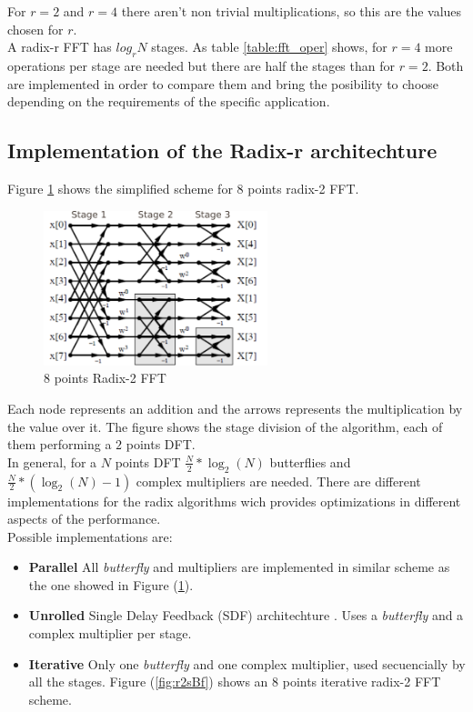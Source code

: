 \documentclass[conference]{IEEEtran}
\begin{document}
For $r=2$ and $r=4$ there aren't non trivial multiplications, so this are the values chosen for $r$.\\
A radix-r FFT has $log_rN$ stages. As table \ref{table:fft_oper} shows, for $r=4$ more operations per stage are needed but there are
half the stages than for $r=2$. Both are implemented in order to compare them and bring the posibility to choose
depending on the requirements of the specific application.

\subsection{Implementation of the Radix-r architechture}

Figure \ref{fig:r2_8} shows the simplified scheme for $8$ points radix-2 FFT.

\begin{figure}[htb!]
        \centering
        \includegraphics[width=6.5cm]{./figures/r2_8.png}
        \caption{8 points Radix-2 FFT}
        \label{fig:r2_8}
\end{figure}

Each node represents an addition and the arrows represents the multiplication by the value over it. 
The figure shows the stage division of the algorithm, each of them performing a $2$ points DFT.\\
In general, for a $N$ points DFT $\frac{N}{2}*\log_2(N)$ butterflies and $\frac{N}{2}*(\log_2(N)-1)$ complex multipliers
are needed. There are different implementations for the radix algorithms wich provides optimizations in 
different aspects of the performance.\\
Possible implementations are:

\begin{itemize}
  \item \textbf{Parallel} All \textit{butterfly} and multipliers are implemented in similar scheme as 
  the one showed in Figure (\ref{fig:r2_8}).
  \item \textbf{Unrolled} Single Delay Feedback (SDF) architechture \cite{torkelson}. Uses a \textit{butterfly} and a complex multiplier per stage.
  \item \textbf{Iterative} Only one \textit{butterfly} and one complex multiplier, used secuencially
  by all the stages. Figure (\ref{fig:r2sBf}) shows an $8$ points iterative radix-2 FFT scheme. 
\end{itemize}
\end{document}
